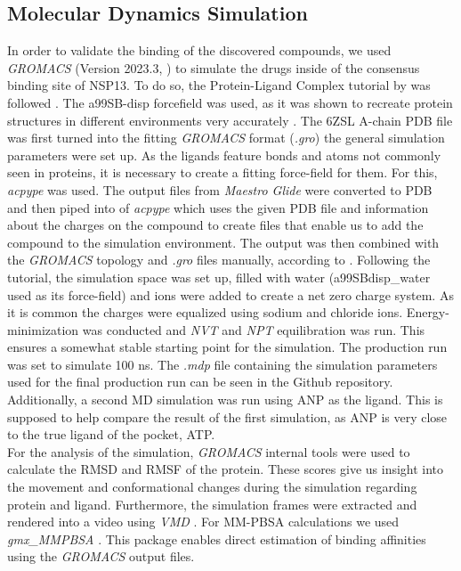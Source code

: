 \documentclass[11pt, letterpaper, titlepage]{article}
\renewcommand{\cite}{\parencite}
\begin{document}
\subsection{Molecular Dynamics Simulation}
In order to validate the binding of the discovered compounds, we used \textit{GROMACS} (Version 2023.3, \textcite{packageGROMACS}) to simulate the drugs inside of the consensus binding site of NSP13. To do so, the Protein-Ligand Complex tutorial by  was followed \cite{Lemkul2018}. The a99SB-disp forcefield was used, as it was shown to recreate protein structures in different environments very accurately \cite{Forcefield}. The 6ZSL A-chain PDB file was first turned into the fitting \textit{GROMACS} format (\textit{.gro}) the general simulation parameters were set up. 
As the ligands feature bonds and atoms not commonly seen in proteins, it is necessary to create a fitting force-field for them. For this, \textit{acpype} \cite{acpype} was used. The output files from \textit{Maestro Glide} were converted to PDB and then piped into  of \textit{acpype} which uses the given PDB file and information about the charges on the compound to create files that enable us to add the compound to the simulation environment. The output was then combined with the \textit{GROMACS} topology and \textit{.gro} files manually, according to .
Following the tutorial, the simulation space was set up, filled with water (a99SBdisp\_water used as its force-field) and ions were added to create a net zero charge system. As it is common the charges were equalized using sodium and chloride ions. Energy-minimization was conducted and \textit{NVT} and \textit{NPT} equilibration was run. This ensures a somewhat stable starting point for the simulation. The production run was set to simulate 100 ns. The \textit{.mdp} file containing the simulation parameters used for the final production run can be seen in the Github repository. Additionally, a second \ac{MD} simulation was run using ANP as the ligand. This is supposed to help compare the result of the first simulation, as ANP is very close to the true ligand of the pocket, ATP.\\
For the analysis of the simulation, \textit{GROMACS} internal tools were used to calculate the RMSD and RMSF of the protein. These scores give us insight into the movement and conformational changes during the simulation regarding protein and ligand. Furthermore, the simulation frames were extracted and rendered into a video using \textit{VMD} \cite{VMD}. For MM-PBSA calculations we used \textit{gmx\_MMPBSA} \cite{MMPBSA1}. This package enables direct estimation of binding affinities using the \textit{GROMACS} output files.
\end{document}

